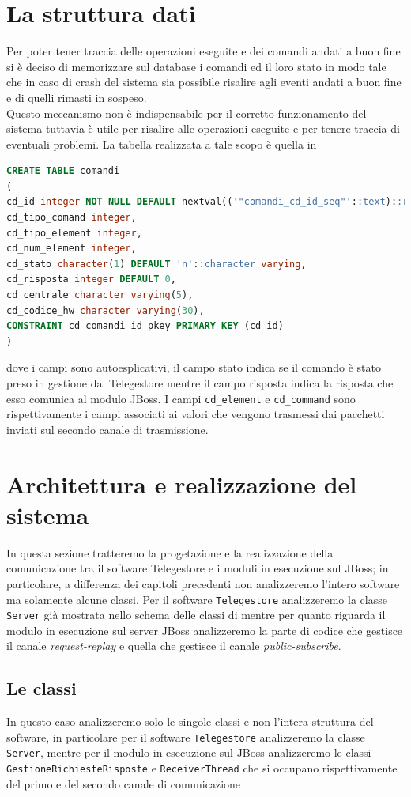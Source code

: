 \section{La struttura dati}
Per poter tener traccia delle operazioni eseguite e dei comandi andati a buon fine si è deciso di memorizzare sul database i comandi ed il loro stato in modo tale che in caso di crash del sistema sia possibile risalire agli eventi andati a buon fine e di quelli rimasti in sospeso.\\
Questo meccanismo non è indispensabile per il corretto funzionamento del sistema tuttavia è utile per risalire alle operazioni eseguite e per tenere traccia di eventuali problemi.
La tabella realizzata a tale scopo è quella in 
\begin{lstlisting}[language=SQL,caption=Tabella comandi,label=lst:tabcodici2]
CREATE TABLE comandi
(
cd_id integer NOT NULL DEFAULT nextval(('"comandi_cd_id_seq"'::text)::regclass),
cd_tipo_comand integer,
cd_tipo_element integer,
cd_num_element integer,
cd_stato character(1) DEFAULT 'n'::character varying,
cd_risposta integer DEFAULT 0,
cd_centrale character varying(5),
cd_codice_hw character varying(30),
CONSTRAINT cd_comandi_id_pkey PRIMARY KEY (cd_id)
)
\end{lstlisting}
dove i campi sono autoesplicativi, il campo stato indica se il comando è stato preso in gestione dal Telegestore mentre il campo risposta indica la risposta che esso comunica al modulo JBoss. I campi \texttt{cd\_element} e \texttt{cd\_command} sono rispettivamente i campi associati ai valori che vengono trasmessi dai pacchetti inviati sul secondo canale di trasmissione.
\section{Architettura e realizzazione del sistema}
In questa sezione tratteremo la progetazione e la realizzazione della comunicazione tra il software Telegestore e i moduli in esecuzione sul JBoss; in particolare, a differenza dei capitoli precedenti non analizzeremo l'intero software ma solamente alcune classi. Per il software \texttt{Telegestore} analizzeremo la classe \texttt{Server} già mostrata nello schema delle classi di  mentre per quanto riguarda il modulo in esecuzione sul server JBoss analizzeremo la parte di codice che gestisce il canale \emph{request-replay} e quella che gestisce il canale \emph{public-subscribe}.
\subsection{Le classi}
In questo caso analizzeremo solo le singole classi e non l'intera struttura del software, in particolare per il software \texttt{Telegestore} analizzeremo la classe \texttt{Server}, mentre per il modulo in esecuzione sul JBoss analizzeremo le classi \texttt{GestioneRichiesteRisposte} e \texttt{ReceiverThread} che si occupano rispettivamente del primo e del secondo canale di comunicazione
